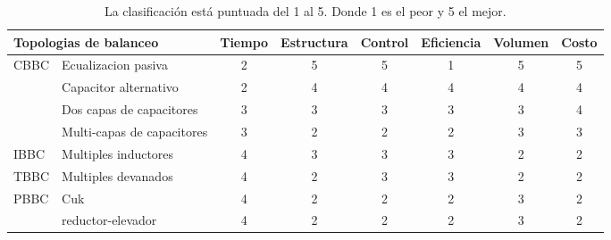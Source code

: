 \documentclass[10pt,a4paper]{article}
\begin{document}
\begin{table}[h!]
\begin{center}
\begin{tabular}{@{}llcccccc@{}}
\toprule
\multicolumn{2}{l}{Topologias de balanceo}                                                 & Tiempo & Estructura & Control & Eficiencia & Volumen & Costo \\ \midrule
\multirow{4}{*}{\acrshort{CBBC}} & Ecualizacion pasiva                    & 2      & 5                       & 5                     & 1          & 5       & 5     \\
                                                  & Capacitor alternativo                  & 2      & 4                       & 4                     & 4          & 4       & 4     \\
                                                  & Dos capas de capacitores               & 3      & 3                       & 3                     & 3          & 3       & 4     \\
                                                  & Multi-capas de capacitores             & 3      & 2                       & 2                     & 2          & 3       & 3     \\
\acrshort{IBBC}                  & Multiples inductores                   & 4      & 3                       & 3                     & 3          & 2       & 2     \\
\acrshort{TBBC}                  & Multiples devanados & 4      & 2                       & 3                     & 3          & 2       & 2     \\
\multirow{2}{*}{\acrshort{PBBC}} & Cuk                                    & 4      & 2                       & 2                     & 2          & 3       & 2     \\
                                                  & reductor-elevador                      & 4      & 2                       & 2                     & 2          & 3       & 2     \\ \cmidrule(l){2-8}
\end{tabular}
\caption{La clasificaci\'on est\'a puntuada del 1 al 5. Donde 1 es el peor
y 5 el mejor.}
\label{comp_bal_table}
\end{center}
\end{table}
\end{document}
